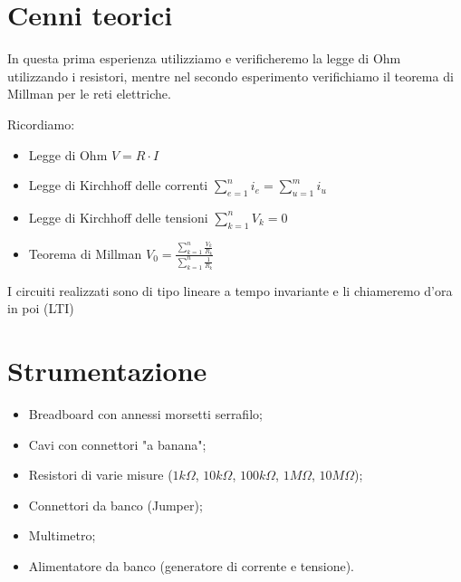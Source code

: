     \section{Cenni teorici}
    In questa prima esperienza utilizziamo e verificheremo la legge di Ohm utilizzando i resistori, mentre nel secondo esperimento
    verifichiamo il teorema di Millman per le reti elettriche. \par
    Ricordiamo:
    \begin{itemize}
        \item Legge di Ohm $V = R \cdot I$
        \item Legge di Kirchhoff delle correnti $\sum_{e = 1}^{n} i_e = \sum_{u = 1}^{m} i_u $
        \item Legge di Kirchhoff delle tensioni $\sum_{k = 1}^{n} V_k = 0 $
        \item Teorema di Millman $V_0 = \frac{\sum_{k = 1}^{n} \frac{V_k}{R_k} }{\sum_{k = 1}^{n} \frac{1}{R_k} }$
    \end{itemize}
    I circuiti realizzati sono di tipo lineare a tempo invariante e li chiameremo d'ora in poi (LTI)
    
    
    \section{Strumentazione}
    \begin{itemize}
        \item Breadboard con annessi morsetti serrafilo;
        \item Cavi con connettori "a banana";
        \item Resistori di varie misure ($1k\Omega$, $10k\Omega$, $100k\Omega$, $1M\Omega$, $10M\Omega$);
        \item Connettori da banco (Jumper);
        \item Multimetro;
        \item Alimentatore da banco (generatore di corrente e tensione).
    \end{itemize}

